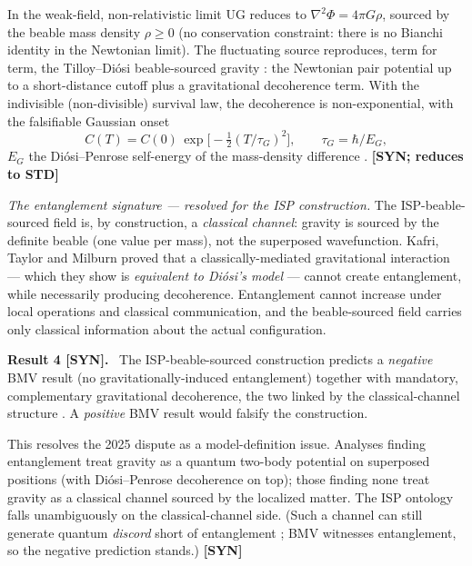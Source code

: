 \documentclass[aps,prd,preprint,amsmath,amssymb,nofootinbib,superscriptaddress]{revtex4-2}
\newenvironment{result}[1]{\par\medskip\noindent\textbf{#1}\ }{\par\medskip}
\begin{document}
In the weak-field, non-relativistic limit UG reduces to $\nabla^2\Phi=4\pi G\rho$, sourced
by the beable mass density $\rho\ge0$ (no conservation constraint: there is no Bianchi
identity in the Newtonian limit). The fluctuating source reproduces, term for term, the
Tilloy--Di\'osi beable-sourced gravity \cite{TilloyDiosi2016}: the Newtonian pair potential
up to a short-distance cutoff plus a gravitational decoherence term. With the indivisible
(non-divisible) survival law, the decoherence is non-exponential, with the falsifiable
Gaussian onset
\begin{equation}
C(T)=C(0)\,\exp\!\big[-\tfrac12(T/\tau_G)^2\big],\qquad \tau_G=\hbar/E_G,
\end{equation}
$E_G$ the Di\'osi--Penrose self-energy of the mass-density difference
\cite{Diosi1989,Penrose1996}. \textbf{[SYN; reduces to STD]}

\emph{The entanglement signature --- resolved for the ISP construction.} The
ISP-beable-sourced field is, by construction, a \emph{classical channel}: gravity is
sourced by the definite beable (one value per mass), not the superposed wavefunction.
Kafri, Taylor and Milburn \cite{KTM2014} proved that a classically-mediated gravitational
interaction --- which they show is \emph{equivalent to Di\'osi's model} --- cannot create
entanglement, while necessarily producing decoherence. Entanglement cannot increase under
local operations and classical communication, and the beable-sourced field carries only
classical information about the actual configuration.

\begin{result}{Result 4 [SYN].}
The ISP-beable-sourced construction predicts a \emph{negative} BMV result (no
gravitationally-induced entanglement) together with mandatory, complementary gravitational
decoherence, the two linked by the classical-channel structure \cite{KTM2014}. A
\emph{positive} BMV result would falsify the construction.
\end{result}

This resolves the 2025 dispute as a model-definition issue. Analyses finding entanglement
\cite{Trillo2025} treat gravity as a quantum two-body potential on superposed positions
(with Di\'osi--Penrose decoherence on top); those finding none \cite{Collapse2025,KTM2014}
treat gravity as a classical channel sourced by the localized matter. The ISP ontology
falls unambiguously on the classical-channel side. (Such a channel can still generate
quantum \emph{discord} short of entanglement \cite{Discord2022}; BMV witnesses entanglement,
so the negative prediction stands.) \textbf{[SYN]}
\end{document}
